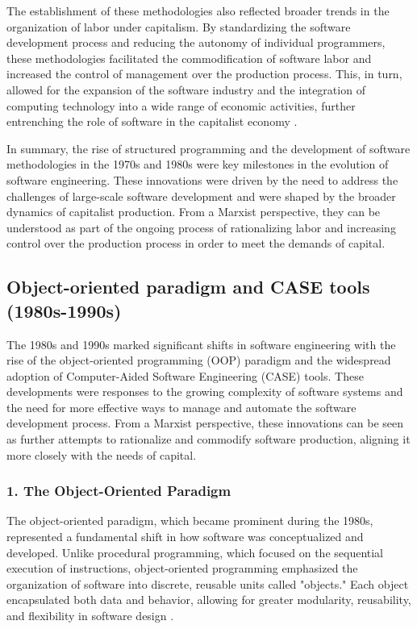 \begin{refsection}
\begin{multicols}{2}
{The establishment of these methodologies also reflected broader trends in the organization of labor under capitalism. By standardizing the software development process and reducing the autonomy of individual programmers, these methodologies facilitated the commodification of software labor and increased the control of management over the production process. This, in turn, allowed for the expansion of the software industry and the integration of computing technology into a wide range of economic activities, further entrenching the role of software in the capitalist economy \cite{marx1867capital}.

In summary, the rise of structured programming and the development of software methodologies in the 1970s and 1980s were key milestones in the evolution of software engineering. These innovations were driven by the need to address the challenges of large-scale software development and were shaped by the broader dynamics of capitalist production. From a Marxist perspective, they can be understood as part of the ongoing process of rationalizing labor and increasing control over the production process in order to meet the demands of capital.
}
\subsection{Object-oriented paradigm and CASE tools (1980s-1990s)}
{\small
The 1980s and 1990s marked significant shifts in software engineering with the rise of the object-oriented programming (OOP) paradigm and the widespread adoption of Computer-Aided Software Engineering (CASE) tools. These developments were responses to the growing complexity of software systems and the need for more effective ways to manage and automate the software development process. From a Marxist perspective, these innovations can be seen as further attempts to rationalize and commodify software production, aligning it more closely with the needs of capital.

\subsubsection*{1. The Object-Oriented Paradigm}

The object-oriented paradigm, which became prominent during the 1980s, represented a fundamental shift in how software was conceptualized and developed. Unlike procedural programming, which focused on the sequential execution of instructions, object-oriented programming emphasized the organization of software into discrete, reusable units called "objects." Each object encapsulated both data and behavior, allowing for greater modularity, reusability, and flexibility in software design \cite{stroustrup1986cpp, gamma1994design}.

}
\end{multicols}
\end{refsection}

